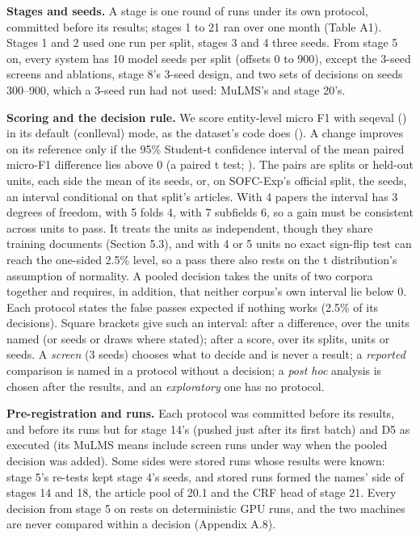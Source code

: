 \documentclass[11pt,a4paper]{article}
\begin{document}
\textbf{Stages and seeds.} A stage is one round of runs under its own protocol,
committed before its results; stages 1 to 21 ran over one month (Table
A1). Stages 1 and 2 used one run per split, stages 3 and 4 three seeds.
From stage 5 on, every system has 10 model seeds per split (offsets 0 to
900), except the 3-seed screens and ablations, stage 8's 3-seed design,
and two sets of decisions on seeds 300--900, which a 3-seed run had not
used: MuLMS's and stage 20's.

\textbf{Scoring and the decision rule.} We score entity-level micro F1 with
seqeval (\citealp{nakayama2018seqeval}) in its default (conlleval) mode, as the
dataset's code does (\citealp{tjongkimsang2003introduction}). A change improves on
its reference only if the 95\% Student-t confidence interval of the mean
paired micro-F1 difference lies above 0 (a paired t test;
\citealp{dror2018hitchhiker}). The pairs are splits or held-out
units, each side the mean of its seeds, or, on SOFC-Exp's official split,
the seeds, an interval conditional on that split's articles. With 4 papers
the interval has 3 degrees of freedom, with 5 folds 4, with 7 subfields 6,
so a gain must be consistent across units to pass. It treats the units as
independent, though they share training documents (Section 5.3), and
with 4 or 5 units no exact sign-flip test can reach the one-sided 2.5\%
level, so a pass there also rests on the t distribution's assumption of
normality. A pooled decision takes the units of two corpora together
and requires, in addition, that neither corpus's own interval lie below 0.
Each protocol states the false passes expected if nothing works (2.5\% of
its decisions). Square brackets give such an interval: after a difference,
over the units named (or seeds or draws where stated); after a score, over
its splits, units or seeds. A \emph{screen} (3 seeds) chooses what to decide
and is never a result; a \emph{reported} comparison is named in a protocol
without a decision; a \emph{post hoc} analysis is chosen after the results, and
an \emph{exploratory} one has no protocol.

\textbf{Pre-registration and runs.} Each protocol was committed before its
results, and before its runs but for stage 14's (pushed just after its
first batch) and D5 as executed (its MuLMS means include screen runs under
way when the pooled decision was added). Some sides were stored runs whose
results were known: stage 5's re-tests kept stage 4's seeds, and stored
runs formed the names' side of stages 14 and 18, the article pool of 20.1
and the CRF head of stage 21. Every decision from stage 5 on rests on
deterministic GPU runs, and the two machines are never compared within a
decision (Appendix A.8).
\end{document}
